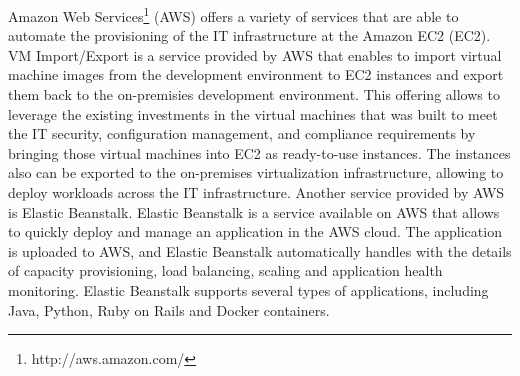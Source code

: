 Amazon Web Services\footnote{http://aws.amazon.com/} (AWS) offers a variety of services that are able
to automate the provisioning of the IT infrastructure at the Amazon EC2 (EC2). VM Import/Export is a
service provided by AWS that enables to import virtual machine images from the development environment
to EC2 instances and export them back to the on-premisies development environment. This offering allows
to leverage the existing investments in the virtual machines that was built to meet the IT security,
configuration management, and compliance requirements by bringing those virtual machines into EC2 as
ready-to-use instances. The instances also can be exported to the on-premises virtualization infrastructure,
allowing to deploy workloads across the IT infrastructure. Another service provided by AWS is Elastic Beanstalk.
Elastic Beanstalk is a service available on AWS that allows to quickly deploy and manage an application in
the AWS cloud. The application is uploaded to AWS, and Elastic Beanstalk automatically handles with the
details of capacity provisioning, load balancing, scaling and application health monitoring. Elastic Beanstalk
supports several types of applications, including Java, Python, Ruby on Rails and Docker containers.

